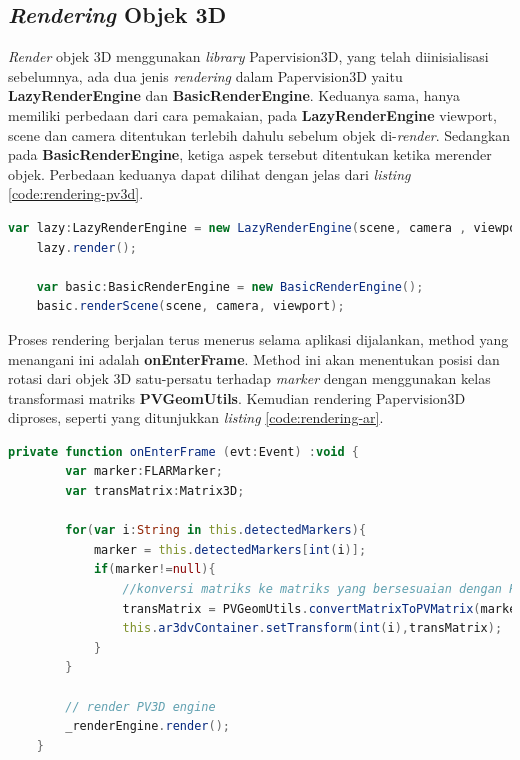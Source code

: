 \subsection{\textit{Rendering} Objek 3D}
\label{subsec:implementasi_rendering_objek3D}
\textit{Render} objek 3D menggunakan \textit{library} Papervision3D, yang telah diinisialisasi sebelumnya, ada dua jenis \textit{rendering} dalam Papervision3D yaitu \textbf{LazyRenderEngine} dan \textbf{BasicRenderEngine}. Keduanya sama, hanya memiliki perbedaan dari cara pemakaian, pada \textbf{LazyRenderEngine} viewport, scene dan camera ditentukan terlebih dahulu sebelum objek di-\textit{render}. Sedangkan pada \textbf{BasicRenderEngine}, ketiga aspek tersebut ditentukan ketika merender objek. Perbedaan keduanya dapat dilihat dengan jelas dari \textit{listing} \ref{code:rendering-pv3d}.

\begin{lstlisting}[language=ActionScript,caption=Rendering PV3D,label=code:rendering-pv3d]
	var lazy:LazyRenderEngine = new LazyRenderEngine(scene, camera , viewport);
	lazy.render();
	
	var basic:BasicRenderEngine = new BasicRenderEngine();
	basic.renderScene(scene, camera, viewport);
\end{lstlisting}

Proses rendering berjalan terus menerus selama aplikasi dijalankan, method yang menangani ini adalah \textbf{onEnterFrame}. Method ini akan menentukan posisi dan rotasi dari objek 3D satu-persatu terhadap \textit{marker} dengan menggunakan kelas transformasi matriks \textbf{PVGeomUtils}. Kemudian rendering Papervision3D diproses, seperti yang ditunjukkan \textit{listing} \ref{code:rendering-ar}.

\begin{lstlisting}[language=ActionScript,caption=Rendering AR,label=code:rendering-ar]
	private function onEnterFrame (evt:Event) :void {
		var marker:FLARMarker;
		var transMatrix:Matrix3D;
		
		for(var i:String in this.detectedMarkers){
			marker = this.detectedMarkers[int(i)];
			if(marker!=null){
				//konversi matriks ke matriks yang bersesuaian dengan PV3D
				transMatrix = PVGeomUtils.convertMatrixToPVMatrix(marker.transformMatrix);
				this.ar3dvContainer.setTransform(int(i),transMatrix);			
			}
		}
		
		// render PV3D engine
		_renderEngine.render();
	}
\end{lstlisting}


